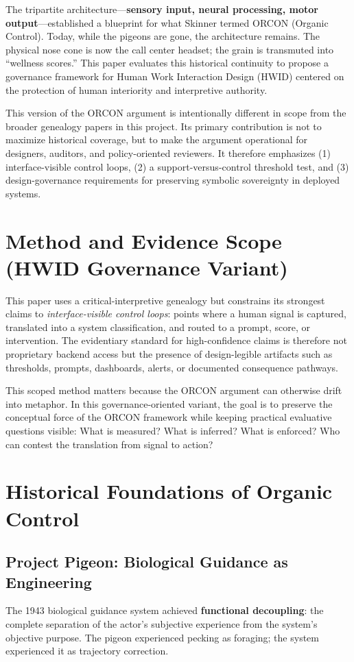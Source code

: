 \documentclass[11pt, a4paper]{article}
\begin{document}
The tripartite architecture—\textbf{sensory input, neural processing, motor output}—established a blueprint for what Skinner termed ORCON (Organic Control). Today, while the pigeons are gone, the architecture remains. The physical nose cone is now the call center headset; the grain is transmuted into ``wellness scores.'' This paper evaluates this historical continuity to propose a governance framework for Human Work Interaction Design (HWID) centered on the protection of human interiority and interpretive authority.

This version of the ORCON argument is intentionally different in scope from the broader genealogy papers in this project. Its primary contribution is not to maximize historical coverage, but to make the argument operational for designers, auditors, and policy-oriented reviewers. It therefore emphasizes (1) interface-visible control loops, (2) a support-versus-control threshold test, and (3) design-governance requirements for preserving symbolic sovereignty in deployed systems.

\section{Method and Evidence Scope (HWID Governance Variant)}

This paper uses a critical-interpretive genealogy but constrains its strongest claims to \textit{interface-visible control loops}: points where a human signal is captured, translated into a system classification, and routed to a prompt, score, or intervention. The evidentiary standard for high-confidence claims is therefore not proprietary backend access but the presence of design-legible artifacts such as thresholds, prompts, dashboards, alerts, or documented consequence pathways.

This scoped method matters because the ORCON argument can otherwise drift into metaphor. In this governance-oriented variant, the goal is to preserve the conceptual force of the ORCON framework while keeping practical evaluative questions visible: What is measured? What is inferred? What is enforced? Who can contest the translation from signal to action?

\section{Historical Foundations of Organic Control}

\subsection{Project Pigeon: Biological Guidance as Engineering}
The 1943 biological guidance system achieved \textbf{functional decoupling}: the complete separation of the actor's subjective experience from the system's objective purpose. The pigeon experienced pecking as foraging; the system experienced it as trajectory correction.
\end{document}
